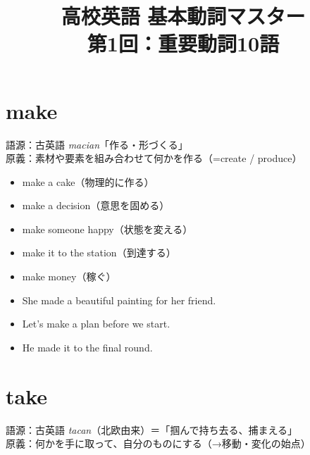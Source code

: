 ﻿\documentclass[a4paper,12pt]{article}
\title{高校英語 基本動詞マスター \\ \large 第1回：重要動詞10語}
\date{}
\begin{document}
\maketitle

\section*{make}

\begin{tcolorbox}[title=語源と原義]
語源：古英語 \textit{macian}「作る・形づくる」\\
原義：素材や要素を組み合わせて何かを作る（=create / produce）
\end{tcolorbox}

\begin{tcolorbox}[title=意味の展開]

\begin{itemize}
  \item make a cake（物理的に作る）
  \item make a decision（意思を固める）
  \item make someone happy（状態を変える）
  \item make it to the station（到達する）
  \item make money（稼ぐ）
\end{itemize}

\end{tcolorbox}

\begin{tcolorbox}[title=例文]

\begin{itemize}
  \item She made a beautiful painting for her friend.
  \item Let’s make a plan before we start.
  \item He made it to the final round.
\end{itemize}

\end{tcolorbox}



\section*{take}

\begin{tcolorbox}[title=語源と原義]
語源：古英語 \textit{tacan}（北欧由来）＝「掴んで持ち去る、捕まえる」\\
原義：何かを手に取って、自分のものにする（→移動・変化の始点）
\end{tcolorbox}
\end{document}
